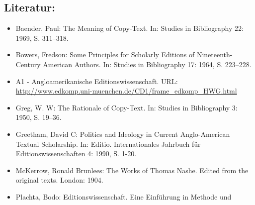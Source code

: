 \documentclass{article}
\begin{document}
        \subsection*{Literatur:}\begin{itemize}\item Baender, Paul: The Meaning of Copy-Text. In: Studies in Bibliography 22: 1969, S. 311–318.\item Bowers, Fredson: Some Principles for Scholarly Editions of
                              Nineteenth-Century American Authors. In: Studies in Bibliography 17: 1964, S. 223–228.\item A1 - Angloamerikanische Editionswissenschaft. URL: \url{http://www.edkomp.uni-muenchen.de/CD1/frame_edkomp_HWG.html}\item Greg, W. W: The Rationale of Copy-Text. In: Studies in Bibliography 3: 1950, S. 19–36.\item Greetham, David C: Politics and Ideology in Current Anglo-American Textual
                              Scholarship. In: Editio. Internationales Jahrbuch für
                              Editionswissenschaften 4: 1990, S. 1-20.\item McKerrow, Ronald Brunlees: The Works of Thomas Nashe. Edited from the original
                              texts. London: 1904.\item Plachta, Bodo: Editionswissenschaft. Eine Einführung in Methode und

\end{itemize}
\end{document}
